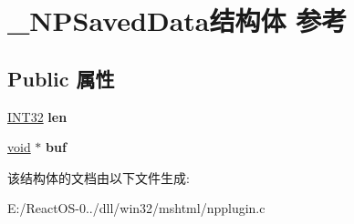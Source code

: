 \hypertarget{struct___n_p_saved_data}{}\section{\+\_\+\+N\+P\+Saved\+Data结构体 参考}
\label{struct___n_p_saved_data}
\subsection*{Public 属性}
\begin{DoxyCompactItemize}
\item 
\mbox{\label{struct___n_p_saved_data_a3630cf86045f16b1339f9d4ef1a4ca8a}} 
\hyperlink{_processor_bind_8h_a1137216524060afd426c34677fed058b}{I\+N\+T32} {\bfseries len}
\item 
\mbox{\label{struct___n_p_saved_data_acbee6e01aa8846a70ba05709b78fa6bc}} 
\hyperlink{interfacevoid}{void} $\ast$ {\bfseries buf}
\end{DoxyCompactItemize}


该结构体的文档由以下文件生成\+:\begin{DoxyCompactItemize}
\item 
E\+:/\+React\+O\+S-\/0../dll/win32/mshtml/npplugin.\+c\end{DoxyCompactItemize}
